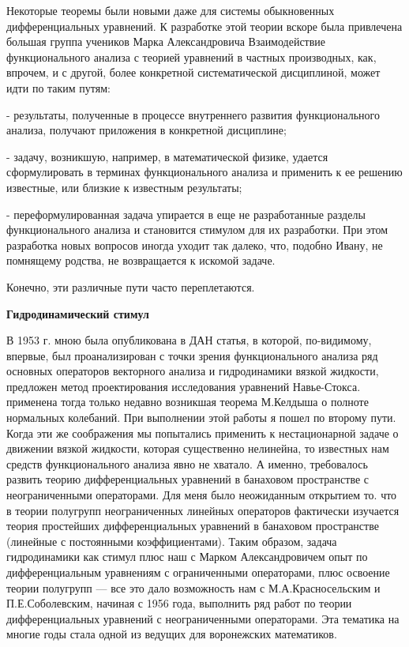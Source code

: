 Некоторые теоремы были новыми даже для системы обыкновенных дифференциальных уравнений. К разработке этой теории вскоре была привлечена большая группа учеников Марка Александровича Взаимодействие функционального анализа с теорией уравнений в частных производных, как, впрочем, и с другой, более конкретной систематической дисциплиной, может идти по таким путям:

- результаты,   полученные   в процессе внутреннего развития функционального анализа, получают приложения в конкретной дисциплине;

-	задачу, возникшую, например, в математической физике, удается
 сформулировать в терминах функционального анализа и применить к ее решению известные, или близкие к известным результаты;
 
-	переформулированная задача упирается в еще не разработанные разделы функционального анализа и становится стимулом для их разработки. При этом разработка новых вопросов иногда уходит так далеко, что, подобно Ивану, не помнящему родства, не возвращается к искомой задаче.

Конечно, эти различные пути часто переплетаются.

{\bf Гидродинамический стимул}

В 1953 г. мною была опубликована в ДАН статья, в которой, по-видимому, впервые, был проанализирован с точки зрения функционального анализа ряд основных операторов векторного анализа и гидродинамики вязкой жидкости, предложен метод проектирования исследования уравнений Навье-Стокса. применена тогда только недавно возникшая теорема М.Келдыша о полноте нормальных колебаний. При выполнении этой работы я пошел по второму пути. Когда эти же соображения мы попытались применить к нестационарной задаче о движении вязкой жидкости, которая существенно нелинейна, то известных нам средств функционального анализа явно не хватало. А именно, требовалось развить теорию дифференциальных уравнений в банаховом пространстве с неограниченными операторами. Для меня было неожиданным открытием то. что в теории полугрупп неограниченных линейных операторов фактически изучается теория простейших дифференциальных уравнений в банаховом пространстве (линейные с постоянными коэффициентами). Таким образом, задача гидродинамики как стимул плюс наш с Марком Александровичем опыт по дифференциальным уравнениям с ограниченными операторами, плюс освоение теории полугрупп — все это дало возможность нам с М.А.Красносельским и П.Е.Соболевским, начиная с 1956 года, выполнить ряд работ по теории дифференциальных уравнений с неограниченными операторами. Эта тематика на многие годы стала одной из ведущих для воронежских математиков.


